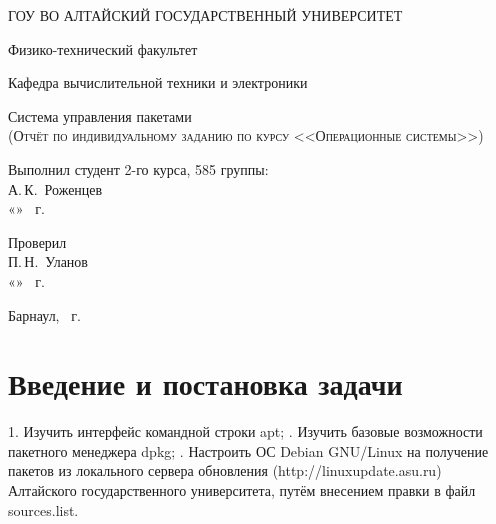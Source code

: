 \documentclass[a4paper,14pt]{extarticle}
\begin{document}
\begin{titlepage}
  \begin{center}
    ГОУ ВО АЛТАЙСКИЙ ГОСУДАРСТВЕННЫЙ УНИВЕРСИТЕТ
    \vspace{0.25cm}
    
    Физико-технический факультет
    
    Кафедра вычислительной техники и электроники
    \vfill
    
    {\LARGE Система управления пакетами}\\[5mm]
    \textsc{(Отчёт по индивидуальному заданию по курсу <<Операционные системы>>)}
  \bigskip

\end{center}
\vfill

\newlength{\ML}
\hfill\begin{minipage}{0.4\textwidth}
  Выполнил студент 2-го курса, 585 группы:\\
  \underline{\hspace{\ML}} А.\,К.~Роженцев\\
  «\underline{\hspace{0.7cm}}» \underline{\hspace{2cm}} \the\year~г.
\end{minipage}%
\bigskip

\hfill\begin{minipage}{0.4\textwidth}
  Проверил\\
  \underline{\hspace{\ML}} П.\,Н.~Уланов\\
  «\underline{\hspace{0.7cm}}» \underline{\hspace{2cm}} \the\year~г.
\end{minipage}%
\vfill

\begin{center}
  Барнаул, \the\year~г.
\end{center}
\end{titlepage}


\tableofcontents

\section{Введение и постановка задачи}
1. Изучить интерфейс командной строки apt;
. Изучить базовые возможности пакетного менеджера dpkg;
. Настроить ОС Debian GNU/Linux на получение пакетов из
локального сервера обновления (http://linuxupdate.asu.ru) Алтайского государственного университета, путём внесением
правки в файл sources.list.
\newline
\end{document}
